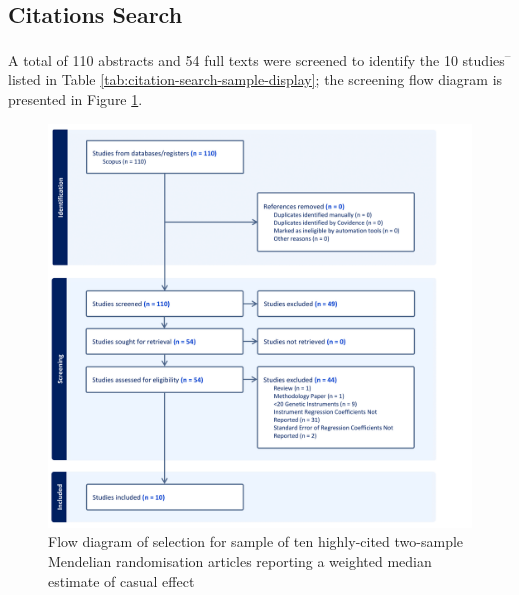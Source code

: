 \documentclass[
]{article}
\begin{document}
\newpage

\subsection{Citations Search}\label{citations-search}

A total of 110 abstracts and 54 full texts were screened to identify the 10 studies\textsuperscript{--} listed in Table \ref{tab:citation-search-sample-display}; the screening flow diagram is presented in Figure \ref{fig:screening-flow}.

\begin{figure}
\includegraphics[width=1\linewidth]{../Data/Citations_Search/WME_citation_search_flow_diagram_crop} \caption{Flow diagram of selection for sample of ten highly-cited two-sample Mendelian randomisation articles reporting a weighted median estimate of casual effect}\label{fig:screening-flow}
\end{figure}
\end{document}
